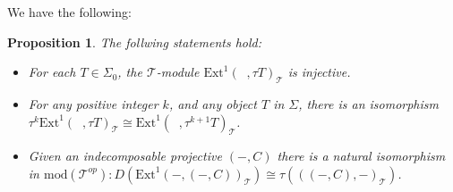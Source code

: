 \documentclass{amsart}
\theoremstyle{plain}
\newtheorem{proposition}{Proposition}
\numberwithin{equation}{section}
\begin{document}
We have the following:

\begin{proposition}
The follwing statements hold:

\begin{itemize}
\item[(a)] For each $T\in \Sigma _{0}$, the $\mathcal{T}$-module $\mathrm{Ext}^{1}(\;\;,\tau T)_{\mathcal{T}}$ is injective.

\item[(b)] For any positive integer $k$, and any object $T$ in $\Sigma $,
there is an isomorphism $\tau ^{k}\mathrm{Ext}^{1}(\;\;,\tau T)_{\mathcal{T}}\cong \mathrm{Ext}^{1}(\;\;,\tau ^{k+1}T)_{\mathcal{T}}$.

\item[(c)] Given an indecomposable projective $(-,C)$ there is a natural
isomorphism in $\mathrm{mod}(\mathcal{T}^{op}):D(\mathrm{Ext}^{1}(-,(-,C))_{\mathcal{T}})\cong \tau (((-,C),-)_{\mathcal{T}})$.
\end{itemize}
\end{proposition}
\end{document}
